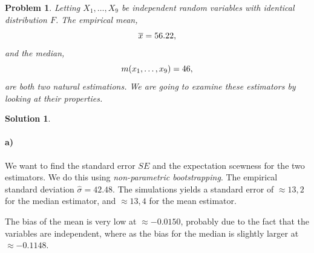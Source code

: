 \documentclass[a4paper, fleqn]{amsart}
\newtheorem{prb}{Problem}
\theoremstyle{definition}
\newtheorem{sltn}{Solution}
\begin{document}
\begin{prb}
  Letting $X_1, \dots, X_9$ be independent random variables with identical
  distribution $F$. The \textit{empirical mean}, 
  \begin{equation}
    \notag
    \overline{x} = 56.22, 
  \end{equation}
  and the median, 
  \begin{equation}
    \notag m(x_1, \dots, x_9) = 46, 
  \end{equation}
  are both two natural estimations. We are going to examine these estimators by looking
  at their properties.
\end{prb}
\begin{sltn}
\item\paragraph{a)} 
We want to find the standard error $SE$ and the expectation scewness for the
two estimators. We do this using \textit{non-parametric bootstrapping}. The
empirical standard deviation $\hat{\sigma} = 42.48$.  The simulations yields
a standard error of $\approx 13,2$ for the median estimator, and $\approx
13,4$ for the mean estimator.

The bias of the mean is very low at $\approx -0.0150$, probably due to the fact
that the variables are independent, where as the bias for the median is
slightly larger at $\approx -0.1148$.


\end{sltn}
\end{document}
